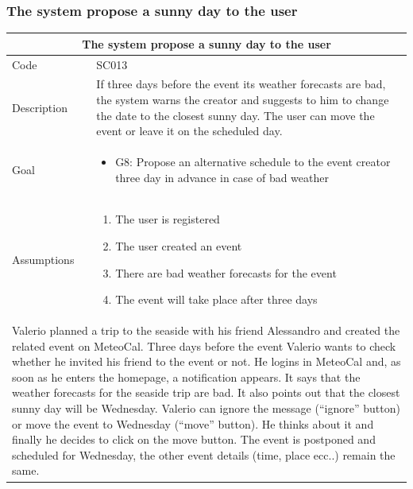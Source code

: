 \documentclass[10pt,a4paper,titlepage]{article}
\begin{document}
\subsubsection{The system propose a sunny day to the user}
\begin{tabular}{| p{3cm} | p{10cm} |}
\hline \multicolumn{2}{|c|}{\textbf{The system propose a sunny day to the user}} \\ 
\hline Code & SC013 \\ 
\hline Description & If three days before the event its weather forecasts are bad, the system warns the creator and suggests to him to change the date to the closest sunny day. The user can move the event or leave it on the scheduled day.\\
\hline Goal & \begin{itemize}\item G8: Propose an alternative schedule to the event creator three day in advance in case of bad weather\end{itemize}\\
\hline Assumptions  & \begin{enumerate}
\item The user is registered
\item The user created an event
\item There are bad weather forecasts for the event
\item The event will take place after three days
\end{enumerate} \\
\hline \multicolumn{2}{|p{13cm}|}{Valerio planned a trip to the seaside with his friend Alessandro and created the related event on MeteoCal. Three days before the event Valerio wants to check whether he invited his friend to the event or not. He logins in MeteoCal and, as soon as he enters the homepage, a notification appears. It says that the  weather forecasts for the seaside trip are bad. It also points out that the closest sunny day will be Wednesday. Valerio can ignore the message (“ignore” button) or move the event to Wednesday (“move” button). He thinks about it and finally he decides to click on the move button. The event is postponed and scheduled for Wednesday, the other event details (time, place ecc..) remain the same.}\\
\hline
\end{tabular}
\end{document}
